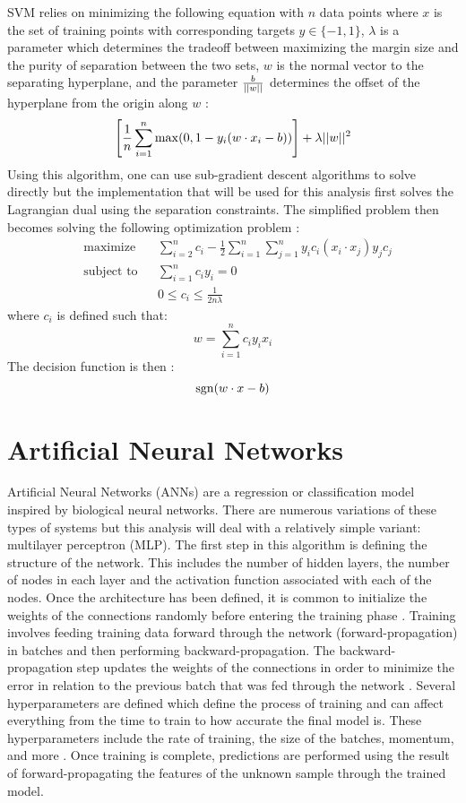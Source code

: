 SVM relies on minimizing the following equation with $n$ data points where $x$ is the set of training points with corresponding targets $y \in \{-1, 1\}$, $\lambda$ is a parameter which determines the tradeoff between maximizing the margin size and the purity of separation between the two sets, $w$ is the normal vector to the separating hyperplane, and the parameter $\frac{b}{\lvert\lvert w \rvert\rvert}$ determines the offset of the hyperplane from the origin along $w$ \cite{SVM}:
$$\left[\frac{1}{n}\sum\limits_{i=1}^n \max(0, 1 - y_i(w \cdot x_i - b))\right] + \lambda\lvert\lvert w \rvert\rvert^2$$
Using this algorithm, one can use sub-gradient descent algorithms to solve directly \cite{SVMGradient} but the implementation that will be used for this analysis first solves the Lagrangian dual using the separation constraints. The simplified problem then becomes solving the following optimization problem \cite{SVM}:
\begin{equation*}
\begin{aligned}
& \underset{}{\text{maximize}}
& & \sum\limits_{i=2}^n c_i - \frac{1}{2}\sum\limits_{i=1}^n \sum\limits_{j=1}^n y_i c_i (x_i \cdot x_j) y_j c_j \\
& \text{subject to}
& & \sum\limits_{i=1}^n c_i y_i = 0\\
&&& 0 \leq c_i \leq \frac{1}{2n\lambda}
\end{aligned}
\end{equation*}
where $c_i$ is defined such that:
$$w = \sum\limits_{i=1}^n c_i y_i x_i$$
The decision function is then \cite{SVM}:
$$\operatorname{sgn}(w \cdot x - b)$$



\section{Artificial Neural Networks}
Artificial Neural Networks (ANNs) are a regression or classification model inspired by biological neural networks. There are numerous variations of these types of systems but this analysis will deal with a relatively simple variant: multilayer perceptron (MLP). The first step in this algorithm is defining the structure of the network. This includes the number of hidden layers, the number of nodes in each layer and the activation function associated with each of the nodes. Once the architecture has been defined, it is common to initialize the weights of the connections randomly before entering the training phase \cite{AnnInit}. Training involves feeding training data forward through the network (forward-propagation) in batches and then performing backward-propagation. The backward-propagation step updates the weights of the connections in order to minimize the error in relation to the previous batch that was fed through the network \cite{AnnSpec}. Several hyperparameters are defined which define the process of training and can affect everything from the time to train to how accurate the final model is. These hyperparameters include the rate of training, the size of the batches, momentum, and more \cite{AnnSpec}. Once training is complete, predictions are performed using the result of forward-propagating the features of the unknown sample through the trained model.

